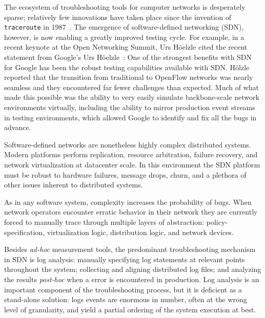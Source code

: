 The ecosystem of troubleshooting tools for computer networks is desperately
sparse; relatively few innovations have taken place since the invention of
{\tt traceroute} in 1987~\cite{traceroute}. The emergence of software-defined
networking (SDN), however, is now enabling a greatly improved testing 
cycle. For example, in a recent keynote at the Open Networking Summit,
Urs H\"oelzle cited the recent statement from Google's Urs H\"oelzle~\cite{urs}:
One of the strongest benefits with SDN for Google has been the robust
testing capabilities available with SDN. H\"olzle reported that the
transition from traditional to OpenFlow networks was nearly seamless and
they encountered far fewer challenges than expected. Much of what made
this possible was the ability to very easily simulate backbone-scale
network environments virtually, including the ability to mirror
production event streams in testing environments, which allowed Google
to identify and fix all the bugs in advance.

Software-defined networks are nonetheless highly complex distributed systems.
Modern platforms perform replication, resource arbitration, failure recovery, and network 
virtualization at datacenter scale. In this environment the SDN platform must be robust to
hardware failures, message drops, churn, and a plethora of other issues
inherent to distributed systems.

As in any software system, complexity increases the probability of
bugs. When network operators encounter erratic behavior in their network
they are currently forced to manually trace through
multiple layers of abstraction: policy-specification, virtualization logic,
distribution logic, and network devices. 


Besides {\it ad-hoc} measurement tools,
the predominant troubleshooting mechanism in SDN is
log analysis: manually specifying log statements at relevant points throughout the system;
collecting and aligning distributed log files; and analyzing the
results {\it post-hoc} when a error is encountered in production. Log analysis
is an important component of the troubleshooting process, but it is deficient
as a stand-alone solution: logs events
are enormous in number, often at the wrong level of granularity,
and yield a partial ordering of the system execution at best.

